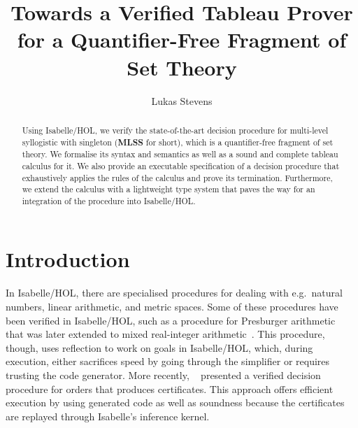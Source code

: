 \documentclass[runningheads]{llncs}
\newcommand{\MLSS}{\textbf{MLSS}}
\begin{document}

\setcounter{tocdepth}{1}

\title{Towards a Verified Tableau Prover for a Quantifier-Free Fragment of Set Theory}
\author{Lukas Stevens}

\maketitle

\begin{abstract}
  Using Isabelle/HOL, we verify the state-of-the-art decision procedure for multi-level syllogistic with singleton (\MLSS{} for short), which is a quantifier-free fragment of set theory.
  We formalise its syntax and semantics as well as a sound and complete tableau calculus for it.
  We also provide an executable specification of a decision procedure that exhaustively applies the rules of the calculus and prove its termination.
  Furthermore, we extend the calculus with a lightweight type system that paves the way for an integration of the procedure into Isabelle/HOL.
\end{abstract}

\section{Introduction}
In Isabelle/HOL, there are specialised procedures for dealing with e.g.\ natural numbers, linear arithmetic, and metric spaces.
Some of these procedures have been verified in Isabelle/HOL, such as a procedure for Presburger arithmetic~\cite{presburger} that was later extended to mixed real-integer arithmetic~\cite{arithmetic}.
This procedure, though, uses reflection to work on goals in Isabelle/HOL, which, during execution, either sacrifices speed by going through the simplifier or requires trusting the code generator.
More recently, \citeauthor{orders}~\cite{orders} presented a verified decision procedure for orders that produces certificates. 
This approach offers efficient execution by using generated code as well as soundness because the certificates are replayed through Isabelle's inference kernel.
\end{document}

